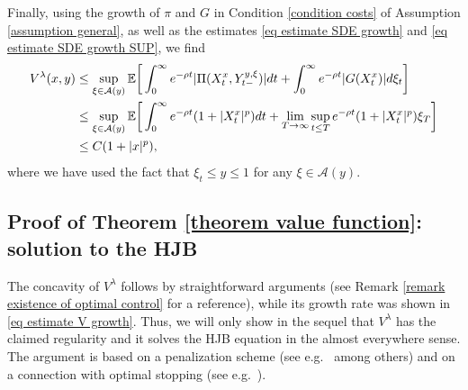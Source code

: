 \documentclass[11pt]{amsart}
\theoremstyle{plain}
\def \dd{{\rm d}}
\numberwithin{equation}{section}
\begin{document}
Finally, using the growth  of $\pi$ and $G$ in Condition \ref{condition costs} of Assumption \ref{assumption general}, as well as the estimates \eqref{eq estimate SDE growth} and \eqref{eq estimate SDE growth SUP}, we find
\begin{equation}\label{eq estimate V growth}
\begin{aligned}
V^\lambda (x,y) & \leq
\sup_{\xi \in \mathcal A (y)} 
 \mathbb E \bigg[ \int_0^{\infty} e^{-\rho t} |\Pi(X^x_t,Y^{y,\xi}_{t-}) |   \dd t      + \int_0^{\infty} e^{-\rho t} |G (X^x_t)| \dd \xi_t \bigg] \\    
& \leq \sup_{\xi \in \mathcal A (y)} 
 \mathbb E \bigg[  \int_0^{\infty} e^{-\rho t} (1+|X^x_t|^p)   \dd t     + \lim_{T\to \infty} \sup_{t \leq T } e^{-\rho t} (1+|X^x_t|^p) \xi_{ T}  \bigg] \\
 &\leq C (1+|x|^p),
\end{aligned}
\end{equation}
where we have used the fact that $\xi_t \leq y \leq 1$ for any $\xi \in \mathcal A (y)$.




\subsection{Proof of Theorem \ref{theorem value function}: solution to the HJB}\label{subsection proof V solves HJB}
The concavity of $V^\lambda$ follows by straightforward arguments (see Remark \ref{remark existence of optimal control} for a reference), while its growth rate was shown in \eqref{eq estimate V growth}.
Thus, we will only show in the sequel that $V^\lambda$ has the claimed regularity and it solves the HJB equation
in the almost everywhere sense.
The argument is based on a penalization scheme (see e.g.\ \cite{williams.chow.menaldi.1994regularity} among others) and on a connection with optimal stopping (see e.g.\ \cite{Karatzas&Shreve84}).
\end{document}
